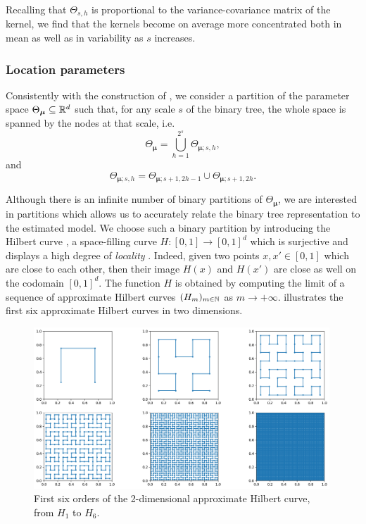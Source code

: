 \documentclass[nonatbib]{elsarticle}
\begin{document}
Recalling that $\Theta_{s,h}$ is proportional to the variance-covariance matrix of the kernel, we find that the kernels become on average more concentrated both in mean as well as in variability as $s$ increases.

\subsubsection{Location parameters}\label{ssec:location-parameters}
Consistently with the construction of \textcite{stefanucci2021}, we consider a partition of the parameter space $\Theta_{\bm{\mu}} \subseteq \mathbb{R}^{d}$ such that, for any scale $s$ of the binary tree, the whole space is spanned by the nodes at that scale, i.e.
\begin{equation}
    \label{eq:locationSpan}
    \Theta_{\bm{\mu}} = \bigcup_{h=1}^{2^{s}} \Theta_{\bm{\mu}; s,h},
\end{equation}
and
\begin{equation}
    \label{eq:locationSpanChildren}
    \Theta_{\bm{\mu}; s,h} = \Theta_{\bm{\mu}; s+1, 2h-1} \cup \Theta_{\bm{\mu};s+1, 2h}.
\end{equation}

Although there is an infinite number of binary partitions of $\Theta_{\bm{\mu}}$, we are interested in partitions which allows us to accurately relate the binary tree representation to the estimated model.
We choose such a binary partition by introducing the Hilbert curve \autocite{hilbert1891}, a space-filling curve $H: [0,1] \to [0,1]^{d}$ which is surjective and displays a high degree of \textit{locality} \autocite{moon2001}.
Indeed, given two points $x,x' \in [0,1]$ which are close to each other, then their image $H(x)$ and $H(x')$ are close as well on the codomain $[0,1]^{d}$.
The function $H$ is obtained by computing the limit of a sequence of approximate Hilbert curves $(H_m)_{m \in \mathbb{N} }$ as $m\to +\infty $.
 illustrates the first six approximate Hilbert curves in two dimensions.
\begin{figure}
    \centering
    \includegraphics[width=0.99\textwidth]{figures/hilbertCurveFirstSixIterations.png}
    \caption{First six orders of the 2-dimensional approximate Hilbert curve, from $H_1$ to $H_6$.}
    \label{fig:hilbertCurveFirstSixIterations}
\end{figure}
\end{document}

